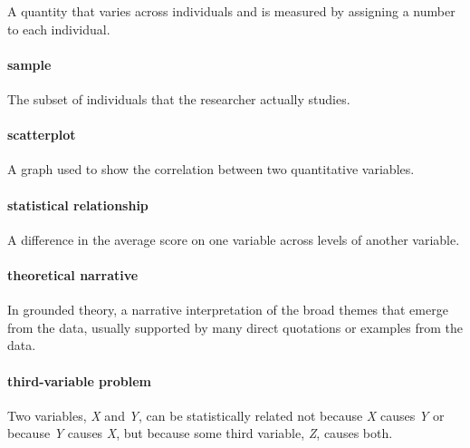 \documentclass[
]{krantz}
\begin{document}
A quantity that varies across individuals and is measured by assigning a number to each individual.

\hypertarget{sample}{%
\paragraph*{sample}\label{sample}}

The subset of individuals that the researcher actually studies.

\hypertarget{scatterplot}{%
\paragraph*{scatterplot}\label{scatterplot}}

A graph used to show the correlation between two quantitative variables.

\hypertarget{statistical-relationship}{%
\paragraph*{statistical relationship}\label{statistical-relationship}}

A difference in the average score on one variable across levels of another variable.

\hypertarget{theoretical-narrative}{%
\paragraph*{theoretical narrative}\label{theoretical-narrative}}

In grounded theory, a narrative interpretation of the broad themes that emerge from the data, usually supported by many direct quotations or examples from the data.

\hypertarget{third-variable-problem}{%
\paragraph*{third-variable problem}\label{third-variable-problem}}

Two variables, \emph{X} and \emph{Y}, can be statistically related not because \emph{X} causes \emph{Y} or because \emph{Y} causes \emph{X}, but because some third variable, \emph{Z}, causes both.
\end{document}
